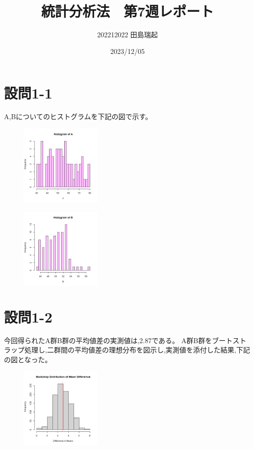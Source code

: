 \documentclass[fontsize = 10pt, paper= a4,twocolumn,column_gap=5zw]{jlreq}
\begin{document}
\title{統計分析法　第7週レポート}
\author{202212022 田島瑞起}
\date{2023/12/05}
\maketitle
\section{設問1-1}
    A,Bについてのヒストグラムを下記の図で示す。
    \begin{figure}
        \centering
        \includegraphics[width=4cm]{7-1-1.png}
    \end{figure}
    \begin{figure}
        \centering
        \includegraphics[width=4cm]{7-1-2.png}
    \end{figure}

\section{設問1-2}
    今回得られたA群B群の平均値差の実測値は,2.87である。
    A群B群をブートストラップ処理し,二群間の平均値差の理想分布を図示し,実測値を添付した結果,下記の図となった。
    \begin{figure}
        \centering
        \includegraphics[width=4cm]{7-1-3.png}
    \end{figure}
\end{document}
